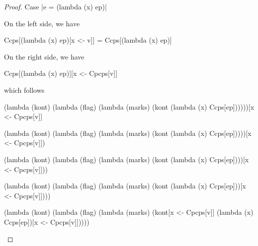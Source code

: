 \begin{proof}{Case \scheme|e = (lambda (x) ep)|}

On the left side, we have
\begin{schemeblock}
\begin{schemedisplay}
Ccps[(lambda (x) ep)[x <- v]] = Ccps[(lambda (x) ep)]
\end{schemedisplay}
\end{schemeblock}

On the right side, we have
\begin{schemeblock}
\begin{schemedisplay}
Ccps[(lambda (x) ep)][x <- Cpcps[v]]
\end{schemedisplay}
\end{schemeblock}
which follows
\begin{schemeblock}
\begin{schemedisplay}
(lambda (kont)
  (lambda (flag)
    (lambda (marks)
      (kont (lambda (x) Ccps[ep])))))[x <- Cpcps[v]]
\end{schemedisplay}
\end{schemeblock}

\begin{schemeblock}
\begin{schemedisplay}
(lambda (kont)
  (lambda (flag)
    (lambda (marks)
      (kont (lambda (x) Ccps[ep]))))[x <- Cpcps[v]])
\end{schemedisplay}
\end{schemeblock}

\begin{schemeblock}
\begin{schemedisplay}
(lambda (kont)
  (lambda (flag)
    (lambda (marks)
      (kont (lambda (x) Ccps[ep])))[x <- Cpcps[v]]))
\end{schemedisplay}
\end{schemeblock}

\begin{schemeblock}
\begin{schemedisplay}
(lambda (kont)
  (lambda (flag)
    (lambda (marks)
      (kont (lambda (x) Ccps[ep]))[x <- Cpcps[v]])))
\end{schemedisplay}
\end{schemeblock}

\begin{schemeblock}
\begin{schemedisplay}
(lambda (kont)
  (lambda (flag)
    (lambda (marks)
      (kont[x <- Cpcps[v]] (lambda (x) Ccps[ep])[x <- Cpcps[v]]))))
\end{schemedisplay}
\end{schemeblock}


\end{proof}
